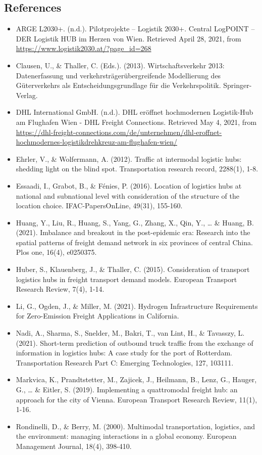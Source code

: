 \documentclass[
]{book}
\providecommand{\tightlist}{%
  \setlength{\itemsep}{0pt}\setlength{\parskip}{0pt}}
\begin{document}
\hypertarget{references-35}{%
\subsection*{References}\label{references-35}}

\begin{itemize}
\tightlist
\item
  ARGE L2030+. (n.d.). Pilotprojekte -- Logistik 2030+. Central LogPOINT -- DER Logistik HUB im Herzen von Wien. Retrieved April 28, 2021, from \url{https://www.logistik2030.at/?page_id=268}
\item
  Clausen, U., \& Thaller, C. (Eds.). (2013). Wirtschaftsverkehr 2013: Datenerfassung und verkehrsträgerübergreifende Modellierung des Güterverkehrs als Entscheidungsgrundlage für die Verkehrspolitik. Springer-Verlag.
\item
  DHL International GmbH. (n.d.). DHL eröffnet hochmodernen Logistik-Hub am Flughafen Wien - DHL Freight Connections. Retrieved May 4, 2021, from \url{https://dhl-freight-connections.com/de/unternehmen/dhl-eroffnet-hochmodernes-logistikdrehkreuz-am-flughafen-wien/}
\item
  Ehrler, V., \& Wolfermann, A. (2012). Traffic at intermodal logistic hubs: shedding light on the blind spot. Transportation research record, 2288(1), 1-8.
\item
  Essaadi, I., Grabot, B., \& Fénies, P. (2016). Location of logistics hubs at national and subnational level with consideration of the structure of the location choice. IFAC-PapersOnLine, 49(31), 155-160.
\item
  Huang, Y., Liu, R., Huang, S., Yang, G., Zhang, X., Qin, Y., \ldots{} \& Huang, B. (2021). Imbalance and breakout in the post-epidemic era: Research into the spatial patterns of freight demand network in six provinces of central China. Plos one, 16(4), e0250375.
\item
  Huber, S., Klauenberg, J., \& Thaller, C. (2015). Consideration of transport logistics hubs in freight transport demand models. European Transport Research Review, 7(4), 1-14.
\item
  Li, G., Ogden, J., \& Miller, M. (2021). Hydrogen Infrastructure Requirements for Zero-Emission Freight Applications in California.
\item
  Nadi, A., Sharma, S., Snelder, M., Bakri, T., van Lint, H., \& Tavasszy, L. (2021). Short-term prediction of outbound truck traffic from the exchange of information in logistics hubs: A case study for the port of Rotterdam. Transportation Research Part C: Emerging Technologies, 127, 103111.
\item
  Markvica, K., Prandtstetter, M., Zajicek, J., Heilmann, B., Lenz, G., Hauger, G., \ldots{} \& Eitler, S. (2019). Implementing a quattromodal freight hub: an approach for the city of Vienna. European Transport Research Review, 11(1), 1-16.
\item
  Rondinelli, D., \& Berry, M. (2000). Multimodal transportation, logistics, and the environment: managing interactions in a global economy. European Management Journal, 18(4), 398-410.
\end{itemize}
\end{document}
